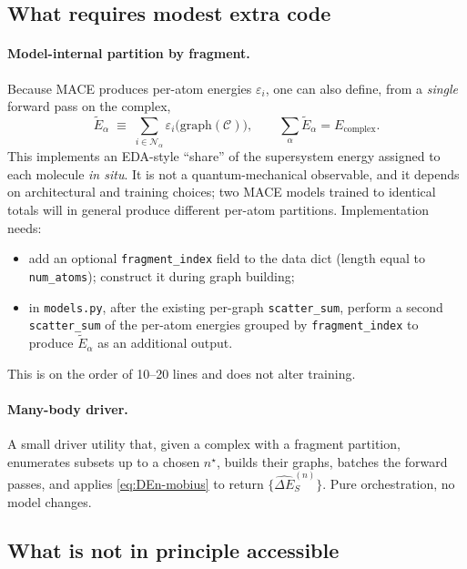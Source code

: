 \documentclass[11pt,a4paper]{article}
\newcommand{\Ecpl}{E_{\mathrm{complex}}}
\begin{document}
\subsection{What requires modest extra code}

\paragraph{Model-internal partition by fragment.}
Because \textsc{MACE} produces per-atom energies $\varepsilon_i$, one can also
define, from a \emph{single} forward pass on the complex,
\begin{equation}
\widetilde{E}_\alpha \;\equiv\; \sum_{i \in \mathcal{N}_\alpha} \varepsilon_i\big(\mathrm{graph}(\mathcal{C})\big),
\qquad
\sum_{\alpha} \widetilde{E}_\alpha = \Ecpl.
\label{eq:tilde-E}
\end{equation}
This implements an EDA-style ``share'' of the supersystem energy assigned to
each molecule \emph{in situ}. It is not a quantum-mechanical observable, and it
depends on architectural and training choices; two \textsc{MACE} models trained
to identical totals will in general produce different per-atom partitions.
Implementation needs:
\begin{itemize}[leftmargin=1.4em]
\item add an optional \texttt{fragment\_index} field to the data dict
(length equal to \texttt{num\_atoms}); construct it during graph building;
\item in \texttt{models.py}, after the existing per-graph
\texttt{scatter\_sum}, perform a second \texttt{scatter\_sum} of the per-atom
energies grouped by \texttt{fragment\_index} to produce
$\widetilde{E}_\alpha$ as an additional output.
\end{itemize}
This is on the order of 10--20 lines and does not alter training.

\paragraph{Many-body driver.}
A small driver utility that, given a complex with a fragment partition,
enumerates subsets up to a chosen $n^\star$, builds their graphs, batches the
forward passes, and applies \cref{eq:DEn-mobius} to return
$\{\widehat{\Delta E}^{(n)}_S\}$. Pure orchestration, no model changes.

\subsection{What is not in principle accessible}
\end{document}
